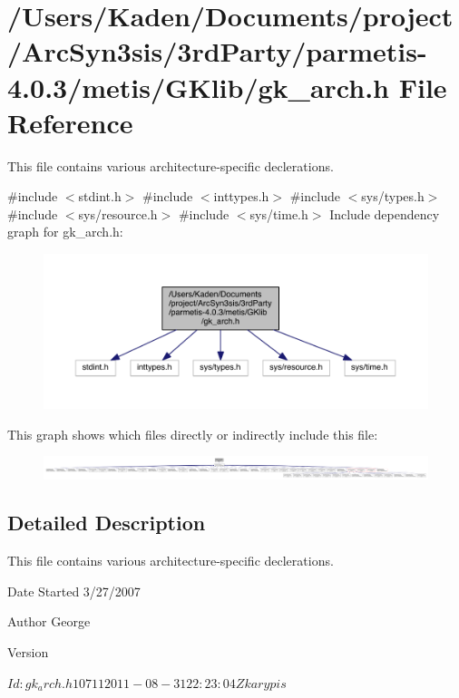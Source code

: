 \hypertarget{a00041}{}\section{/\+Users/\+Kaden/\+Documents/project/\+Arc\+Syn3sis/3rd\+Party/parmetis-\/4.0.3/metis/\+G\+Klib/gk\+\_\+arch.h File Reference}
\label{a00041}


This file contains various architecture-\/specific declerations.  


{\ttfamily \#include $<$stdint.\+h$>$}\newline
{\ttfamily \#include $<$inttypes.\+h$>$}\newline
{\ttfamily \#include $<$sys/types.\+h$>$}\newline
{\ttfamily \#include $<$sys/resource.\+h$>$}\newline
{\ttfamily \#include $<$sys/time.\+h$>$}\newline
Include dependency graph for gk\+\_\+arch.\+h\+:\nopagebreak
\begin{figure}[H]
\begin{center}
\leavevmode
\includegraphics[width=350pt]{a00042}
\end{center}
\end{figure}
This graph shows which files directly or indirectly include this file\+:\nopagebreak
\begin{figure}[H]
\begin{center}
\leavevmode
\includegraphics[width=350pt]{a00043}
\end{center}
\end{figure}


\subsection{Detailed Description}
This file contains various architecture-\/specific declerations. 

\begin{DoxyDate}{Date}
Started 3/27/2007 
\end{DoxyDate}
\begin{DoxyAuthor}{Author}
George 
\end{DoxyAuthor}
\begin{DoxyVersion}{Version}
\begin{DoxyVerb}$Id: gk_arch.h 10711 2011-08-31 22:23:04Z karypis $ \end{DoxyVerb}
 
\end{DoxyVersion}
